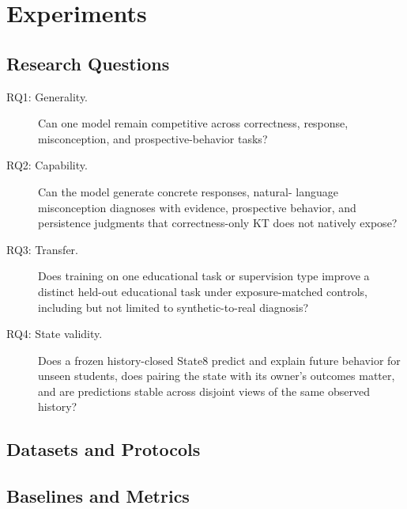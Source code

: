\section{Experiments}
\label{sec:experiments}


\subsection{Research Questions}

\begin{description}
    \item[RQ1: Generality.] Can one model remain competitive across correctness,
    response, misconception, and prospective-behavior tasks?
    \item[RQ2: Capability.] Can the model generate concrete responses, natural-
    language misconception diagnoses with evidence, prospective behavior, and
    persistence judgments that correctness-only KT does not natively expose?
    \item[RQ3: Transfer.] Does training on one educational task or supervision
    type improve a distinct held-out educational task under exposure-matched
    controls, including but not limited to synthetic-to-real diagnosis?
    \item[RQ4: State validity.] Does a frozen history-closed State8 predict and
    explain future behavior for unseen students, does pairing the state with
    its owner's outcomes matter, and are predictions stable across disjoint
    views of the same observed history?
\end{description}

\subsection{Datasets and Protocols}


\subsection{Baselines and Metrics}

